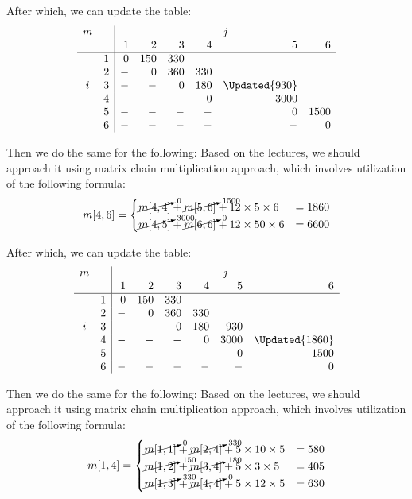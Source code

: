After which, we can update the table:
\[
\begin{array}{cc|rrrrrr}
m &   & \multicolumn{6}{c}{j}                         \\
  &   &  1   &  2  &  3  &  4  &       5       &   6  \\
\hline
  & 1 &  0   & 150 & 330 &     &               &      \\
  & 2 &  -   &  0  & 360 & 330 &               &      \\
i & 3 &  -   &  -  &  0  & 180 & \Updated{930} &      \\
  & 4 &  -   &  -  &  -  &  0  &     3000      &      \\
  & 5 &  -   &  -  &  -  &  -  &       0       & 1500 \\
  & 6 &  -   &  -  &  -  &  -  &       -       &   0
\end{array}
\]


Then we do the same for the following:
Based on the lectures, we should approach it using matrix chain multiplication
approach, which involves utilization of the following formula:
$$
    m[4, 6] =
    \begin{cases}
        \cancelto{0}{m[4, 4]}    + \cancelto{1500}{m[5, 6]} + 12 \times  5 \times 6  & = 1860 \\
        \cancelto{3000}{m[4, 5]} + \cancelto{0}{m[6, 6]}    + 12 \times 50 \times 6  & = 6600
    \end{cases}
$$

After which, we can update the table:
\[
\begin{array}{cc|rrrrrr}
m &   & \multicolumn{6}{c}{j}                          \\
  &   &  1   &  2  &  3  &  4  &   5  &       6        \\
\hline
  & 1 &  0   & 150 & 330 &     &      &                \\
  & 2 &  -   &  0  & 360 & 330 &      &                \\
i & 3 &  -   &  -  &  0  & 180 &  930 &                \\
  & 4 &  -   &  -  &  -  &  0  & 3000 & \Updated{1860} \\
  & 5 &  -   &  -  &  -  &  -  &   0  &     1500       \\
  & 6 &  -   &  -  &  -  &  -  &   -  &       0
\end{array}
\]

Then we do the same for the following:
Based on the lectures, we should approach it using matrix chain multiplication
approach, which involves utilization of the following formula:
$$
    m[1, 4] =
    \begin{cases}
        \cancelto{0}{m[1, 1]}   + \cancelto{330}{m[2, 4]} + 5 \times 10 \times  5  & = 580 \\
        \cancelto{150}{m[1, 2]} + \cancelto{180}{m[3, 4]} + 5 \times  3 \times  5  & = 405 \\
        \cancelto{330}{m[1, 3]} + \cancelto{0}{m[4, 4]}   + 5 \times 12 \times  5  & = 630
    \end{cases}
$$

